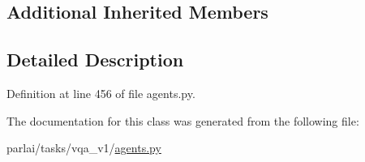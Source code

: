 \subsection*{Additional Inherited Members}


\subsection{Detailed Description}


Definition at line 456 of file agents.\+py.



The documentation for this class was generated from the following file\+:\begin{DoxyCompactItemize}
\item 
parlai/tasks/vqa\+\_\+v1/\hyperlink{parlai_2tasks_2vqa__v1_2agents_8py}{agents.\+py}\end{DoxyCompactItemize}
